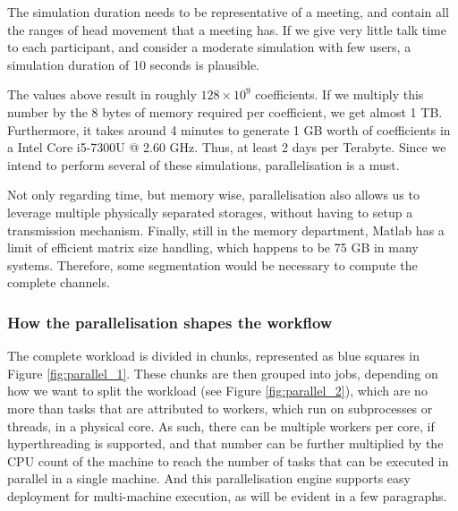 The simulation duration needs to be representative of a meeting, and contain all the ranges of head movement that a meeting has. If we give very little talk time to each participant, and consider a moderate simulation with few users, a simulation duration of 10 seconds is plausible.

The values above result in roughly $128 \times 10^9$ coefficients. If we multiply this number by the 8 bytes of memory required per coefficient, we get almost 1 TB. Furthermore, it takes around 4 minutes to generate 1 GB worth of coefficients in a Intel Core i5-7300U @ 2.60 GHz. Thus, at least 2 days per Terabyte. Since we intend to perform several of these simulations, parallelisation is a must. 

Not only regarding time, but memory wise, parallelisation also allows us to leverage multiple physically separated storages, without having to setup a transmission mechanism. Finally, still in the memory department, Matlab has a limit of efficient matrix size handling, which happens to be 75 GB in many systems. Therefore, some segmentation would be necessary to compute the complete channels.



\subsubsection*{How the parallelisation shapes the workflow}

The complete workload is divided in chunks, represented as blue squares in Figure \ref{fig:parallel_1}. These chunks are then grouped into jobs, depending on how we want to split the workload (see Figure \ref{fig:parallel_2}), which are no more than tasks that are attributed to workers, which run on subprocesses or threads, in a physical core. As such, there can be multiple workers per core, if hyperthreading is supported, and that number can be further multiplied by the \acs{CPU} count of the machine to reach the number of tasks that can be executed in parallel in a single machine. And this parallelisation engine supports easy deployment for multi-machine execution, as will be evident in a few paragraphs.




